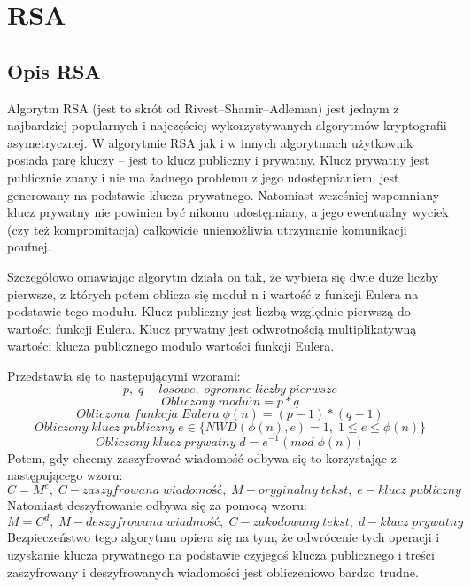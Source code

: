 \section{RSA}
\label{sec:RSA}
\subsection{Opis RSA}
\label{sec:RSAOpis}
Algorytm RSA (jest to skrót od Rivest–Shamir–Adleman) jest jednym z najbardziej popularnych i najczęściej wykorzystywanych algorytmów kryptografii asymetrycznej. W algorytmie RSA jak i w innych algorytmach użytkownik posiada parę kluczy – jest to klucz publiczny i prywatny. Klucz prywatny jest publicznie znany i nie ma żadnego problemu z jego udostępnianiem, jest generowany na podstawie klucza prywatnego. Natomiast wcześniej wspomniany klucz prywatny nie powinien być nikomu udostępniany, a jego ewentualny wyciek (czy też kompromitacja) całkowicie uniemożliwia utrzymanie komunikacji poufnej.

\vspace{1em}

Szczegółowo omawiając algorytm działa on tak, że wybiera się dwie duże liczby pierwsze, z których potem oblicza się moduł n i wartość z funkcji Eulera na podstawie tego modułu. Klucz publiczny jest liczbą względnie pierwszą do wartości funkcji Eulera. Klucz prywatny jest odwrotnością multiplikatywną wartości klucza publicznego modulo wartości funkcji Eulera.

\vspace{1em}

Przedstawia się to następującymi wzorami:
\begin{equation}
    p, \; q-losowe, \; ogromne \; liczby \; pierwsze
\end{equation}
\begin{equation}
    Obliczony \; moduł n=p*q
\end{equation}
\begin{equation}
    Obliczona \; funkcja \; Eulera \; \phi(n)=(p-1)*(q-1)
\end{equation}
\begin{equation}
    Obliczony \; klucz \; publiczny \; e \in \{NWD(\phi(n),e)=1, \; 1 \leqslant e \leqslant \phi(n)\}
\end{equation}
\begin{equation}
    Obliczony \; klucz \; prywatny \; d= e^{-1} (mod \; \phi(n))
\end{equation}
Potem, gdy chcemy zaszyfrować wiadomość odbywa się to korzystając z następującego wzoru:
\begin{equation}
    C= M^e, \; C-zaszyfrowana \;  wiadomość, \; M-oryginalny \; tekst, \; e-klucz \; publiczny
\end{equation}
Natomiast deszyfrowanie odbywa się za pomocą wzoru:
\begin{equation}
    M= C^d, \; M-deszyfrowana \; wiadmość, \;C-zakodowany \; tekst, \; d-klucz \; prywatny
\end{equation}
Bezpieczeństwo tego algorytmu opiera się na tym, że odwrócenie tych operacji i uzyskanie klucza prywatnego na podstawie czyjegoś klucza publicznego i treści zaszyfrowany i deszyfrowanych wiadomości jest obliczeniowo bardzo trudne.

